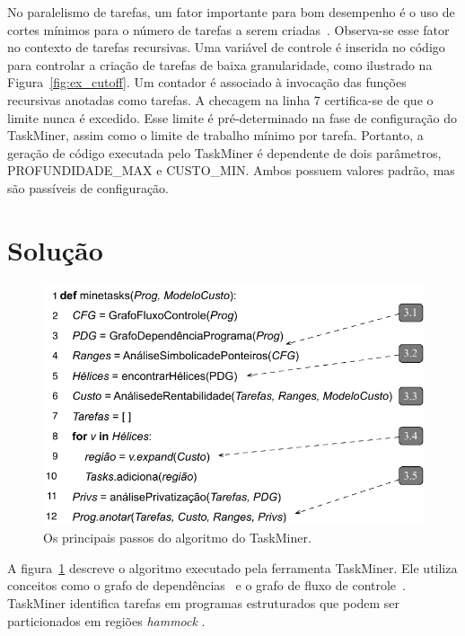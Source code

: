 \documentclass[sigplan,10pt,review]{acmart}
\newcommand\Taskminer{\mbox{\textsf{TaskMiner}}}
\begin{document}
No paralelismo de tarefas, um fator importante para bom desempenho
é o uso de cortes mínimos para o número de tarefas a serem criadas~\cite{Duran08b}. 
Observa-se esse fator no contexto de tarefas recursivas. 
Uma variável de controle é inserida no código para controlar
a criação de tarefas de baixa granularidade, como ilustrado na Figura~\ref{fig:ex_cutoff}. 
Um contador é associado à invocação das funções recursivas anotadas como tarefas. 
A checagem na linha 7 certifica-se de que o limite
nunca é excedido. Esse limite é pré-determinado na fase de configuração do 
{\Taskminer}, assim como o limite de trabalho mínimo
por tarefa. Portanto, a geração 
de código executada pelo {\Taskminer} é dependente de dois parâmetros,
\textsf{PROFUNDIDADE\_MAX} e \textsf{CUSTO\_MIN}. 
Ambos possuem valores padrão, mas são passíveis de configuração.	

\section{Solu\c{c}\~{a}o}
\label{sec:sol}

\begin{figure}[b]
\begin{center}
\includegraphics[width=1\columnwidth]{images/alg_main}
\caption{Os principais passos do algoritmo do TaskMiner.}
\label{fig:alg_main}
\end{center}
\end{figure}

A figura~\ref{fig:alg_main} descreve o algoritmo executado pela ferramenta {\Taskminer}. 
Ele utiliza conceitos  como
o grafo de dependências~\cite{Ferrante87} e o 
grafo de fluxo de controle~\cite{Kildall73}. {\Taskminer}
identifica tarefas em programas estruturados que podem
ser particionados em regiões \textit{hammock}
\cite{Ferrante87}.
\end{document}
